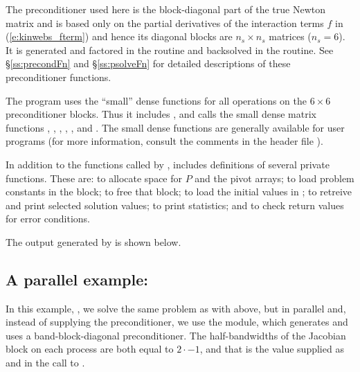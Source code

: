 The preconditioner used here is the block-diagonal part of the true Newton
matrix and is based only on the partial derivatives of the interaction terms $f$
in (\ref{e:kinwebs_fterm}) and hence its  diagonal blocks are $n_s \times n_s$ matrices
($n_s = 6$).
It is generated and factored in the  routine and
backsolved in the  routine.  
See \S\ref{ss:precondFn} and \S\ref{ss:psolveFn} for detailed descriptions
of these preconditioner functions.

The program  uses the ``small'' dense functions for all operations 
on the $6 \times 6$ preconditioner blocks.  
Thus it includes , and calls the small dense matrix
functions , , 
, , , and .
The small dense functions are generally available for {\kinsol} user programs
(for more information, consult the comments in the header file ).

In addition to the functions called by {\kinsol},  includes
definitions of several private functions.  These are: 
to allocate space for $P$ and the pivot arrays; 
to load problem constants in the  block;  to free
that block;  to load the initial values in ; 
 to retreive and print selected solution values;
 to print statistics; and 
to check return values for error conditions.

The output generated by  is shown below.

\vspace{0.1in}


\subsection{A parallel example: }\label{ss:kinwebbbd}

In this example, , we solve the same problem as with
 above, but in parallel and, instead of supplying the preconditioner,
we use the {\kinbbdpre} module, which generates and uses a band-block-diagonal 
preconditioner.
The half-bandwidths of the Jacobian block on each process are both equal to
$2\cdot$$-1$, and that is the value supplied as  and 
in the call to . 

